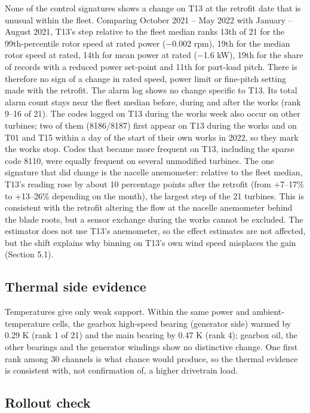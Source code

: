 \documentclass[preprint,12pt]{elsarticle}
\begin{document}
None of the control signatures shows a change on T13 at the retrofit date that is unusual within the fleet. Comparing October 2021 -- May 2022 with January -- August 2021, T13's step relative to the fleet median ranks 13th of 21 for the 99th-percentile rotor speed at rated power (−0.002 rpm), 19th for the median rotor speed at rated, 14th for mean power at rated (−1.6 kW), 19th for the share of records with a reduced power set-point and 11th for part-load pitch. There is therefore no sign of a change in rated speed, power limit or fine-pitch setting made with the retrofit. The alarm log shows no change specific to T13. Its total alarm count stays near the fleet median before, during and after the works (rank 9--16 of 21). The codes logged on T13 during the works week also occur on other turbines; two of them (8186/8187) first appear on T13 during the works and on T01 and T15 within a day of the start of their own works in 2022, so they mark the works stop. Codes that became more frequent on T13, including the sparse code 8110, were equally frequent on several unmodified turbines. The one signature that did change is the nacelle anemometer: relative to the fleet median, T13's reading rose by about 10 percentage points after the retrofit (from +7--17\% to +13--26\% depending on the month), the largest step of the 21 turbines. This is consistent with the retrofit altering the flow at the nacelle anemometer behind the blade roots, but a sensor exchange during the works cannot be excluded. The estimator does not use T13's anemometer, so the effect estimates are not affected, but the shift explains why binning on T13's own wind speed misplaces the gain (Section 5.1).

\subsection{Thermal side evidence}

Temperatures give only weak support. Within the same power and ambient-temperature cells, the gearbox high-speed bearing (generator side) warmed by 0.29 K (rank 1 of 21) and the main bearing by 0.47 K (rank 4); gearbox oil, the other bearings and the generator windings show no distinctive change. One first rank among 30 channels is what chance would produce, so the thermal evidence is consistent with, not confirmation of, a higher drivetrain load.

\subsection{Rollout check}
\end{document}
